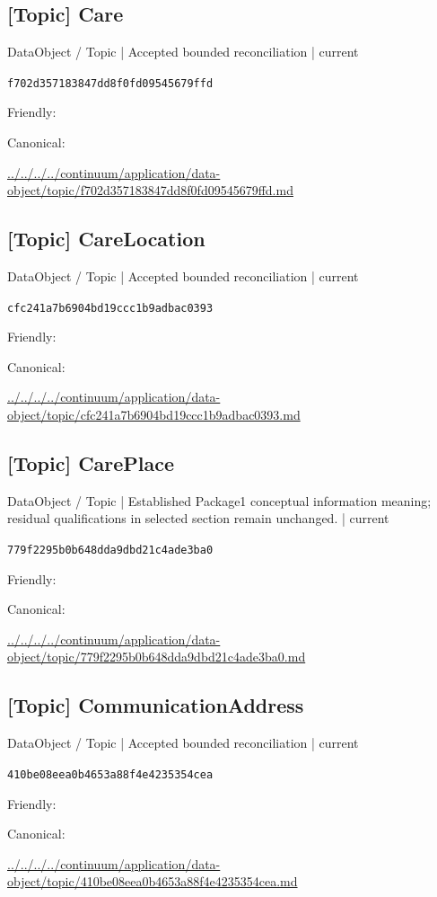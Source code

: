 \documentclass[10pt,a4paper]{article}
\begin{document}
\subsection*{[Topic] Care}
{\small DataObject / Topic | Accepted bounded reconciliation | current}\par
\texttt{f702d357183847dd8f0fd09545679ffd}\par
Friendly: \par
Canonical: \par
{\footnotesize\url{../../../../continuum/application/data-object/topic/f702d357183847dd8f0fd09545679ffd.md}}\par
\subsection*{[Topic] CareLocation}
{\small DataObject / Topic | Accepted bounded reconciliation | current}\par
\texttt{cfc241a7b6904bd19ccc1b9adbac0393}\par
Friendly: \par
Canonical: \par
{\footnotesize\url{../../../../continuum/application/data-object/topic/cfc241a7b6904bd19ccc1b9adbac0393.md}}\par
\subsection*{[Topic] CarePlace}
{\small DataObject / Topic | Established Package1 conceptual information meaning; residual qualifications in selected section remain unchanged. | current}\par
\texttt{779f2295b0b648dda9dbd21c4ade3ba0}\par
Friendly: \par
Canonical: \par
{\footnotesize\url{../../../../continuum/application/data-object/topic/779f2295b0b648dda9dbd21c4ade3ba0.md}}\par
\subsection*{[Topic] CommunicationAddress}
{\small DataObject / Topic | Accepted bounded reconciliation | current}\par
\texttt{410be08eea0b4653a88f4e4235354cea}\par
Friendly: \par
Canonical: \par
{\footnotesize\url{../../../../continuum/application/data-object/topic/410be08eea0b4653a88f4e4235354cea.md}}\par
\end{document}
